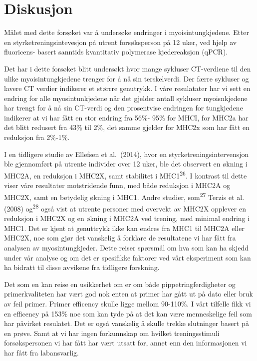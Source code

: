 \documentclass[
  letterpaper,
  DIV=11,
  numbers=noendperiod]{scrreprt}
\begin{document}
\section{Diskusjon}\label{diskusjon-6}

Målet med dette forsøket var å undersøke endringer i myoisintungkjedene.
Etter en styrketreningsintevesjon på utrent forsøksperson på 12 uker,
ved hjelp av fluoricens- basert sanntids kvantitativ polymerase
kjedereaksjon (qPCR).

Det har i dette forsøket blitt undersøkt hvor mange sykluser CT-verdiene
til den ulike myoisintungkjedene trenger for å nå sin terskelverdi. Der
færre sykluser og lavere CT verdier indikerer et størrre genutrykk. I
våre resulatater har vi sett en endring for alle myosintunkjedene når
det gjelder antall sykluser myoisnkjedene har trengt for å nå sin
CT-verdi og den prosentvise endringen for tungkjedene indikerer at vi
har fått en stor endring fra 56\%- 95\% for MHCI, for MHC2a har det
blitt redusert fra 43\% til 2\%, det samme gjelder for MHC2x som har
fått en reduksjon fra 2\%-1\%.

I en tidligere studie av Ellefsen et al.~(2014), hvor en
styrketreningsintervensjon ble gjennomført på utrente individer over 12
uker, ble det observert en økning i MHC2A, en reduksjon i MHC2X, samt
stabilitet i MHC1\textsuperscript{26}. I kontrast til dette viser våre
resultater motstridende funn, med både reduksjon i MHC2A og MHC2X, samt
en betydelig økning i MHC1. Andre studier, som\textsuperscript{27}
Terzis et al. (2008) og\textsuperscript{28} også vist at utrente
personer med overvekt av MHC2X opplever en reduksjon i MHC2X og en
økning i MHC2A ved trening, med minimal endring i MHC1. Det er kjent at
genuttrykk ikke kan endres fra MHC1 til MHC2A eller MHC2X, noe som gjør
det vanskelig å forklare de resultatene vi har fått fra analysen av
myosintungkjeder. Dette reiser spørsmål om hva som kan ha skjedd under
vår analyse og om det er spesifikke faktorer ved vårt eksperiment som
kan ha bidratt til disse avvikene fra tidligere forskning.

Det som en kan reise en usikkerhet om er om både pippetringferdigheter
og primerkvaliteten har vært god nok enten at primer har gått ut på dato
eller bruk av feil primer. Primer efficency skulle ligge mellom
90-110\%. I vårt tilfelle fikk vi en efficency på 153\% noe som kan tyde
på at det kan være menneskelige feil som har påvirket resulatet. Det er
også vanskelig å skulle trekke slutninger basert på en prøve. Samt at vi
har ingen forkunnskap om hvilket treningsstimuli forsøkspersonen vi har
fått har vært utsatt for, annet enn den informasjonen vi har fått fra
labansvarlig.
\end{document}
